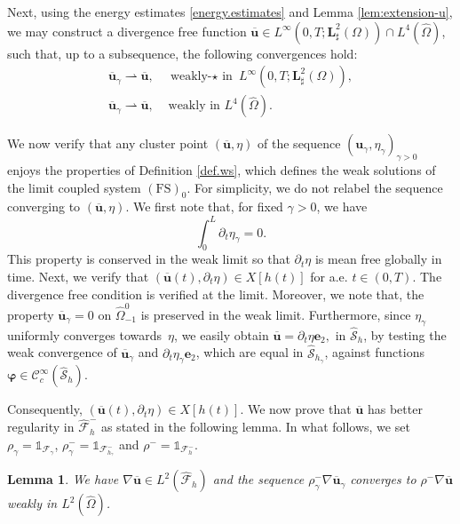 \documentclass[10pt]{amsart}
\let\mathcal\mathscr
\newcommand{\FS}{\mathrm{FS}}
\newtheorem{lemma}[theorem]{Lemma}
\theoremstyle{remark}
\theoremstyle{definition}
\newcommand{\ug}{\boldsymbol{u}}
\newcommand{\BS}[1]{\boldsymbol{#1}}
\let\CM\Omega
\newcommand{\CMT}{\widehat{\Omega}}
\begin{document}
Next, using the energy estimates \eqref{energy.estimates} and Lemma \ref{lem:extension-u}, we may construct a divergence free function $\overline{\ug}\in L^{\infty}(0,T;\BS{L}^{2}_{\sharp}(\CM))\cap L^{4}(\CMT)$, such that, up to a subsequence, the following convergences hold:
\[
\begin{split}
\overline{\ug}_{\gamma}\rightharpoonup\overline{\ug},& \text{ weakly-$\star$ in }L^{\infty}(0,T;\BS{L}^{2}_{\sharp}(\CM)),\\
\overline{\ug}_{\gamma}\rightharpoonup\overline{\ug},&\text{ weakly in } L^{4}(\CMT).
\end{split}
\]

We now verify that any cluster point $(\overline{\ug}, \eta)$ of the sequence $(\ug_{\gamma},\eta_{\gamma})_{\gamma >0}$ enjoys the properties of Definition \ref{def.ws}, which defines the weak solutions of the limit coupled system $(\FS)_0$. For simplicity, we do not relabel the sequence converging to $(\overline{\ug}, \eta)$. We first note that, for fixed $\gamma >0$, we have
\[
\int_0^L \partial_t\eta_{\gamma}=0.
\]
This property is conserved in the weak limit so that $\partial_t\eta$ is mean free globally in time. Next, we verify that $(\overline{\ug}(t),\partial_t \eta) \in X[h(t)]$ for a.e. $t \in (0,T)$. The divergence free condition is verified at the limit. Moreover, we note that,
the property $\overline{\ug}_{\gamma} = 0$ on $\widehat{\Omega}_{-1}^0$ is preserved in the weak limit. Furthermore, since $\eta_\gamma$ uniformly converges towards~$\eta$, we easily obtain $\overline{\ug} =\partial_{t}\eta\BS{e}_2,\text{ in }\widehat{\mathcal{S}}_{h}$, by testing the weak convergence of $ \overline{\ug}_{\gamma}$ and $ \partial_{t}\eta_\gamma\BS{e}_2$, which are equal in $\widehat{\mathcal S}_{h_\gamma}$, against
functions $\BS{\varphi} \in \mathcal C^{\infty}_c(\widehat{\mathcal S}_h)$.

Consequently, $(\overline{\ug}(t),\partial_t \eta) \in X[h(t)]$. We now prove that $\overline{\ug}$ has better regularity in $\widehat{\mathcal F}^-_{h}$ as stated in the following lemma. In what follows, we set $\rho_{\gamma}=\mathds{1}_{\mathcal{F}_{\gamma}}$, $\rho_{\gamma}^{-}=\mathds{1}_{\mathcal{F}_{h_{\gamma}}^{-}}$ and $\rho^{-}=\mathds{1}_{\mathcal{F}_{h}^{-}}$.

\begin{lemma}\label{lemma.gradient}
We have $\nabla \overline{\ug} \in L^2(\widehat{\mathcal F}_h)$ and the sequence $\rho_\gamma^-\nabla \overline{\ug}_{\gamma}$ converges to $\rho^-\nabla \overline{\ug}$ weakly in $L^{2}(\CMT)$.
\end{lemma}
\end{document}
